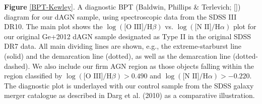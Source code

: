 \label{BPT-Kewley} \textbf{Figure} \ref{BPT-Kewley}. A diagnostic BPT (Baldwin, Phillips \& Terlevich; [\cite{Baldwin_1981}]) diagram for our dAGN sample, using spectroscopic data from the SDSS III DR10. The main plot shows the $\log(\text{[O III]}/\text{H}\beta)$ vs. $\log(\text{[N II]}/\text{H}\alpha)$ plot for our original Ge+2012 dAGN sample designated as Type II in the original SDSS DR7 data. All main dividing lines are shown, e.g., the \cite{Kewley_Dopita_Sutherland_Heisler_Trevena_2001} extreme-starburst line (solid) and the \cite{Kauffmann_2003} demarcation line (dotted), as well as the \cite{Stasinska_2006} demarcation line (dotted-dashed). We also include our firm AGN region as those objects falling within the region classified by $\log(\text{[O III]}/\text{H}\beta)>{0.490}$ and $\log(\text{[N II]}/\text{H}\alpha)>{-0.220}$. The diagnostic plot is underlayed with our control sample from the SDSS galaxy merger catalogue as described in Darg et al. (2010) as a comparative illustration. 